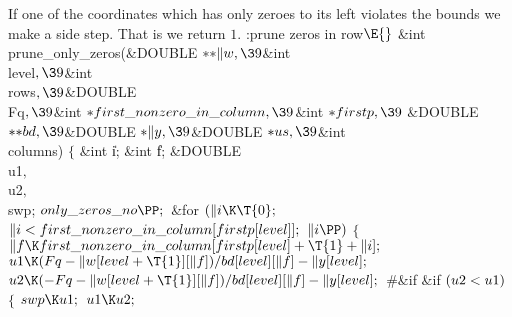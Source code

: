 If one of the coordinates which has only zeroes to its left violates the bounds
we make a side step. That is we return $1$.
\Y\B\4:prune zeros in row\X${}\E{}$\6
\&{int} \\{prune\_only\_zeros}(\&{DOUBLE} ${}{*}{*}\|w,\39{}$\&{int} %
\\{level}${},\39{}$\&{int} \\{rows}${},\39{}$\&{DOUBLE} \\{Fq}${},\39{}$\&{int}
${}{*}\\{first\_nonzero\_in\_column},\39{}$\&{int} ${}{*}\\{firstp},\39{}$%
\&{DOUBLE} ${}{*}{*}\\{bd},\39{}$\&{DOUBLE} ${}{*}\|y,\39{}$\&{DOUBLE} ${}{*}%
\\{us},\39{}$\&{int} \\{columns})\1\1\2\2\6
${}\{{}$\1\6
\&{int} \|i;\6
\&{int} \|f;\6
\&{DOUBLE} \\{u1}${},{}$ \\{u2}${},{}$ \\{swp};\7
${}\\{only\_zeros\_no}\PP;{}$\6
\&{for} ${}(\|i\K\T{0};{}$ ${}\|i<\\{first\_nonzero\_in\_column}[\\{firstp}[%
\\{level}]];{}$ ${}\|i\PP){}$\5
${}\{{}$\1\6
${}\|f\K\\{first\_nonzero\_in\_column}[\\{firstp}[\\{level}]+\T{1}+\|i];{}$\6
${}\\{u1}\K(\\{Fq}-\|w[\\{level}+\T{1}][\|f])/\\{bd}[\\{level}][\|f]-\|y[%
\\{level}];{}$\6
${}\\{u2}\K({-}\\{Fq}-\|w[\\{level}+\T{1}][\|f])/\\{bd}[\\{level}][\|f]-\|y[%
\\{level}];{}$\6
\8\#\&{if} \6
\&{if} ${}(\\{u2}<\\{u1}){}$\5
${}\{{}$\1\6
${}\\{swp}\K\\{u1};{}$\6
${}\\{u1}\K\\{u2};{}$\6
